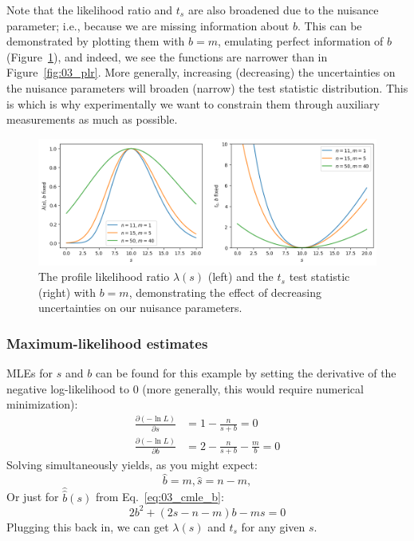 Note that the likelihood ratio and $t_s$ are also broadened due to the nuisance parameter; i.e., because we are missing information about $b$.
This can be demonstrated by plotting them with $b = m$, emulating perfect information of $b$ (Figure~\ref{fig:03_plr_nob}), and indeed, we see the functions are narrower than in Figure~\ref{fig:03_plr}.
More generally, increasing (decreasing) the uncertainties on the nuisance parameters will broaden (narrow) the test statistic distribution.
This is which is why experimentally we want to constrain them through auxiliary measurements as much as possible.

\begin{figure}[tb]
    \centering
    \includegraphics[width=\textwidth]{figures/03-Stats/01-intro/3.png}
    \caption{The profile likelihood ratio $\lambda(s)$ (left) and the $t_s$ test statistic (right) with $b = m$, demonstrating the effect of decreasing uncertainties on our nuisance parameters.}
    \label{fig:03_plr_nob}
\end{figure}

\subsubsection{Maximum-likelihood estimates}

MLEs for $s$ and $b$ can be found for this example by setting the derivative of the negative log-likelihood to 0 (more generally, this would require numerical minimization):
\begin{align}
\label{eq:03_cmle_b}
\frac{\partial (-\ln L)}{\partial s} &= 1 - \frac{n}{s+b} = 0 \\
\frac{\partial (-\ln L)}{\partial b} &= 2 - \frac{n}{s+b} - \frac{m}{b} = 0
\end{align}
Solving simultaneously yields, as you might expect:
\begin{equation}
\label{eq:03_mles}
\hat{b} = m, \hat{s} = n - m,
\end{equation}
Or just for $\hat{\hat{b}}(s)$ from Eq.~\ref{eq:03_cmle_b}:
\begin{equation}
\label{eq:03_cmle_b_f}
2b^2 + (2s - n - m)b - ms = 0
\end{equation}
Plugging this back in, we can get $\lambda(s)$ and $t_s$ for any given $s$.

